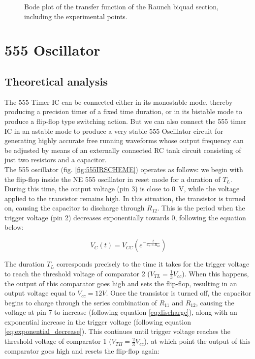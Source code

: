 \documentclass[lettersize,journal]{IEEEtran}
\begin{document}
\begin{figure}
    \centering
    \resizebox{\linewidth}{!}{
        
    }
    \caption{Bode plot of the transfer function of the Raunch biquad section, including the experimental points.}
    \label{graph:magnitude_response_filter}
\end{figure}


\section{555 Oscillator}
\subsection{Theoretical analysis}

The 555 Timer IC can be connected either in its monostable mode, thereby producing a precision timer of a fixed time duration, or in its bistable mode to produce a flip-flop type switching action. But we can also connect the 555 timer IC in an astable mode to produce a very stable 555 Oscillator circuit for generating highly accurate free running waveforms whose output frequency can be adjusted by means of an externally connected RC tank circuit consisting of just two resistors and a capacitor.\\

The 555 oscillator (fig. \ref{fig:555IRSCHEME}) operates as follows: we begin with the flip-flop inside the NE 555 oscillator in reset mode for a duration of \( T_L \). During this time, the output voltage (pin 3) is close to \SI{0}{\volt}, while the voltage applied to the transistor remains high. In this situation, the transistor is turned on, causing the capacitor to discharge through \( R_{12} \). This is the period when the trigger voltage (pin 2) decreases exponentially towards 0, following the equation below:

\begin{equation}
V_C(t) = V_{CC} \left( e^{-\frac{t}{C_7 \times R_{12}}} \right)
\label{eq:charging}
\end{equation}

The duration \( T_L \) corresponds precisely to the time it takes for the trigger voltage to reach the threshold voltage of comparator 2 (\( V_{TL} = \frac{1}{3} V_{cc} \)). When this happens, the output of this comparator goes high and sets the flip-flop, resulting in an output voltage equal to \( V_{cc} = 12V \). Once the transistor is turned off, the capacitor begins to charge through the series combination of \( R_{11} \) and \( R_{12} \), causing the voltage at pin 7 to increase (following equation \ref{eq:discharge}), along with an exponential increase in the trigger voltage (following equation \ref{eq:exponential_decrease}). This continues until trigger voltage reaches the threshold voltage of comparator 1 (\( V_{TH} = \frac{2}{3} V_{cc} \)), at which point the output of this comparator goes high and resets the flip-flop again:
\end{document}

